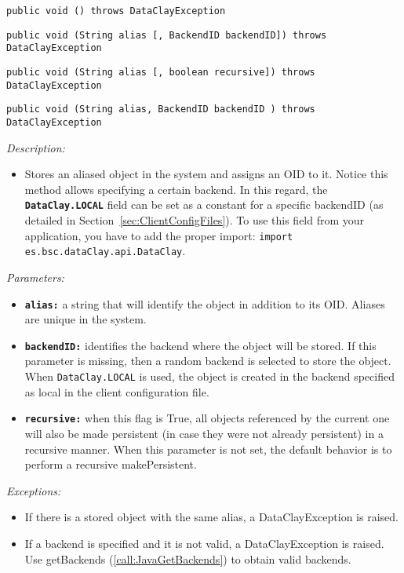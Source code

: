 \begin{dBox}
\texttt{public void  () throws DataClayException}

\texttt{public void  (String alias [, BackendID backendID]) \newline throws DataClayException}

\texttt{public void  (String alias [, boolean recursive]) \newline throws DataClayException}

\texttt{public void  (String alias, BackendID backendID
) throws DataClayException}
\LINE

{\it Description:}

\begin{itemize}
    \item Stores an aliased object in the system and assigns an OID to it. Notice this method allows specifying a certain backend. In this regard, the \colorbox{basecolor!15}{\texttt{\bfseries DataClay.LOCAL}} field can be set as a constant for a specific backendID (as detailed in Section~\ref{sec:ClientConfigFiles}). To use this field from your application, you have to add the proper import: \colorbox{basecolor!15}{\texttt{import es.bsc.dataClay.api.DataClay}}.
\end{itemize}

{\it Parameters:}

\begin{itemize}
    \item \texttt{\bfseries alias:} a string that will identify the object in addition to its OID. Aliases are unique in the system.
    \item \texttt{\bfseries backendID:} identifies the backend where the object will be stored. If this parameter is missing, then a random backend is selected to store the object. When \texttt{DataClay.LOCAL} is used, the object is created in the backend specified as local in the client configuration file.
    \item \texttt{\bfseries recursive:} when this flag is True, all objects referenced by the current one will also be made persistent (in case they were not already persistent) in a recursive manner. When this parameter is not set, the default behavior is to perform a recursive makePersistent.
\end{itemize}

{\it Exceptions:}

\begin{itemize}
    \item If there is a stored object with the same alias, a DataClayException is raised.
    \item If a backend is specified and it is not valid, a DataClayException is raised. Use getBackends (\ref{call:JavaGetBackends}) to obtain valid backends.
\end{itemize}

\end{dBox}

